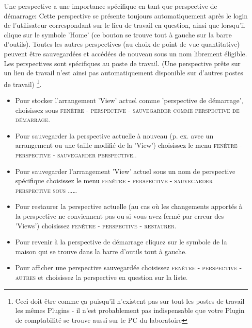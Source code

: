 Une perspective a une importance spécifique en tant que  \glqq perspective de démarrage\grqq{}:
Cette perspective se présente toujours automatiquement après le login de l'utilisateur  correspondant sur le lieu de travail en question, ainsi que lorsqu'il clique sur le symbole 'Home' (ce bouton se trouve tout à gauche sur la barre d'outils). Toutes les autres perspectives (au choix de point de vue quantitative) peuvent être sauvegardées et accédées de nouveau sous un nom librement éligible. Les perspectives sont spécifiques au poste de travail. (Une perspective prête sur un lieu de travail n'est ainsi pas automatiquement disponible sur d'autres postes de travail) \footnote{Ceci doit être comme ça puisqu'il n'existent pas sur tout les postes de travail les mêmes Plugins - il n'est probablement pas indispensable que votre Plugin de comptabilité se trouve aussi sur le PC du laboratoire}.

\begin{itemize}
\item Pour stocker l'arrangement 'View' actuel comme 'perspective de démarrage', choisissez sous  \textsc{fenêtre - perspective - sauvegarder comme perspective de démarrage}.

\item Pour sauvegarder la perspective actuelle à nouveau (p. ex. avec un arrangement ou une taille modifié de la 'View') choisissez le menu  \textsc{fenêtre - perspective - sauvegarder perspective.}.

\item Pour sauvegarder l'arrangement 'View' actuel sous un nom de perspective spécifique choisissez le menu \textsc{fenêtre - perspective - sauvegarder perspective sous …\ldots}

\item Pour restaurer la perspective actuelle (au cas où les changements apportés à la perspective ne conviennent pas ou si vous avez fermé par erreur des 'Views') choisissez  \textsc{fenêtre - perspective - restaurer}.

\item Pour revenir à la perspective de démarrage cliquez sur le symbole de la maison qui se trouve dans la barre d'outils tout à gauche.
\item Pour afficher une perspective sauvegardée choisissez 
\textsc{fenêtre - perspective - autres } et choisissez la perspective en question sur la liste. 

\end{itemize}
